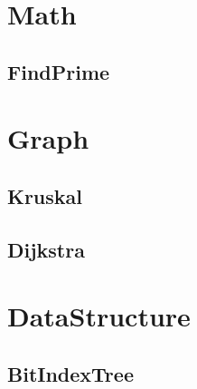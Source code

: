\section{Math}
    \subsection{FindPrime}
        
\section{Graph}
    \subsection{Kruskal}
        
    \subsection{Dijkstra}
        
\section{DataStructure}
    \subsection{BitIndexTree}
        

